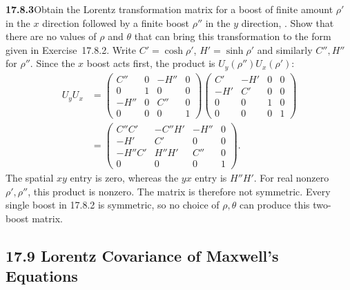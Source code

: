 \par\bigskip
\noindent\textbf{17.8.3}\quad Obtain the Lorentz transformation
matrix for a boost of finite amount $\rho'$ in the $x$ direction
followed by a finite boost $\rho''$ in the $y$ direction,
. Show that
there are no values of $\rho$ and $\theta$ that can bring this
transformation to the form given in Exercise~17.8.2.
\solution
Write $C'=\cosh\rho'$, $H'=\sinh\rho'$ and similarly
$C'',H''$ for $\rho''$. Since the $x$ boost acts first,
the product is $U_y(\rho'')U_x(\rho')$:
\[
\begin{aligned}
U_yU_x
&=\begin{pmatrix}
C''&0&-H''&0\\0&1&0&0\\-H''&0&C''&0\\0&0&0&1
\end{pmatrix}
\begin{pmatrix}
C'&-H'&0&0\\-H'&C'&0&0\\0&0&1&0\\0&0&0&1
\end{pmatrix}\\
&=\boxed{\begin{pmatrix}
C''C'&-C''H'&-H''&0\\
-H'&C'&0&0\\
-H''C'&H''H'&C''&0\\
0&0&0&1
\end{pmatrix}}.
\end{aligned}
\]
The spatial $xy$ entry is zero, whereas the $yx$ entry is
$H''H'$. For real nonzero $\rho',\rho''$, this product is
nonzero. The matrix is therefore not symmetric.
Every single boost in 17.8.2 is symmetric, so no choice of
$\rho,\theta$ can produce this two-boost matrix.


\subsection*{17.9 Lorentz Covariance of Maxwell's Equations}

